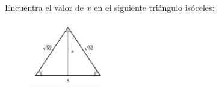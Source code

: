 Encuentra el valor de $x$ en el siguiente triángulo isóceles:
\begin{figure}[H]
    \begin{center}
        \includegraphics[width=0.3\textwidth]{../images/pitagoras4.png}
    \end{center}
    \caption{}
    \label{fig:pitagoras4}
\end{figure}